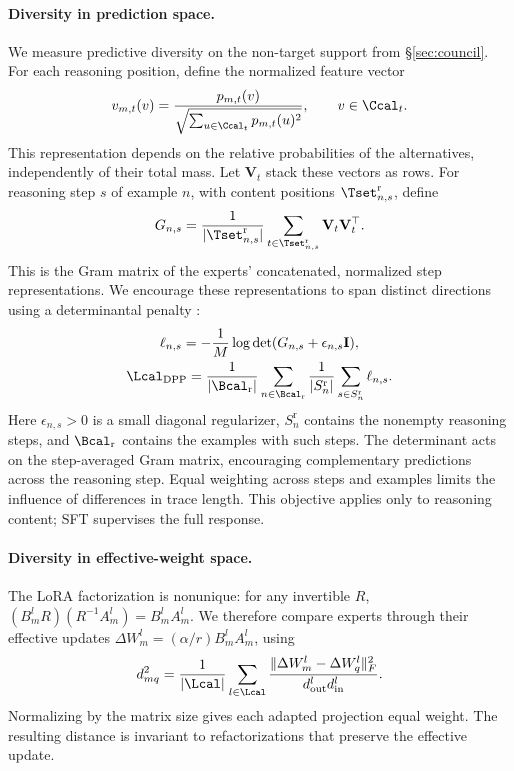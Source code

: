 \paragraph{Diversity in prediction space.}
We measure predictive diversity on the non-target support from
\S\ref{sec:council}. For each reasoning position, define the normalized
feature vector
\begin{equation}
 v_{m,t}(v)=\frac{p_{m,t}(v)}
                  {\sqrt{\sum_{u\in\Ccal_t}p_{m,t}(u)^2}},
 \qquad v\in\Ccal_t.
 \label{eq:stage1-features}
\end{equation}
This representation depends on the relative probabilities of the alternatives,
independently of their total mass. Let $\mathbf V_t$ stack these vectors as
rows. For reasoning step $s$ of example $n$, with content positions
$\Tset_{n,s}^{\mathrm r}$, define
\begin{equation}
 G_{n,s}=\frac{1}{|\Tset_{n,s}^{\mathrm r}|}
           \sum_{t\in\Tset_{n,s}^{\mathrm r}}
                   \mathbf V_t\mathbf V_t^{\top}.
 \label{eq:stage1-gram}
\end{equation}
This is the Gram matrix of the experts' concatenated, normalized step
representations. We encourage these representations to span distinct
directions using a determinantal penalty \citep{kulesza2012dpp}:
\begin{equation}
 \begin{gathered}
 \ell_{n,s}=-\frac{1}{M}\log\det(G_{n,s}+\epsilon_{n,s}\mathbf I),\\
 \Lcal_{\mathrm{DPP}}=
 \frac{1}{|\Bcal_{\mathrm r}|}
 \sum_{n\in\Bcal_{\mathrm r}}\frac{1}{|S_n^{\mathrm r}|}
 \sum_{s\in S_n^{\mathrm r}}\ell_{n,s}.
 \end{gathered}
 \label{eq:dpp}
\end{equation}
Here $\epsilon_{n,s}>0$ is a small diagonal regularizer,
$S_n^{\mathrm r}$ contains the nonempty reasoning steps, and
$\Bcal_{\mathrm r}$ contains the examples with such steps. The determinant
acts on the step-averaged Gram matrix, encouraging complementary predictions
across the reasoning step. Equal weighting across steps and examples limits
the influence of differences in trace length. This objective applies only to
reasoning content; SFT supervises the full response.

\paragraph{Diversity in effective-weight space.}
The LoRA factorization is nonunique: for any invertible $R$,
$(B_m^lR)(R^{-1}A_m^l)=B_m^lA_m^l$. We therefore compare experts through
their effective updates $\Delta W_m^l=(\alpha/r)B_m^lA_m^l$, using
\begin{equation}
 d_{mq}^{2}=\frac{1}{|\Lcal|}\sum_{l\in\Lcal}
 \frac{\|\Delta W_m^l-\Delta W_q^l\|_F^2}
      {d_{\mathrm{out}}^l d_{\mathrm{in}}^l}.
 \label{eq:stage1-distance}
\end{equation}
Normalizing by the matrix size gives each adapted projection equal weight.
The resulting distance is invariant to refactorizations that preserve the
effective update.

